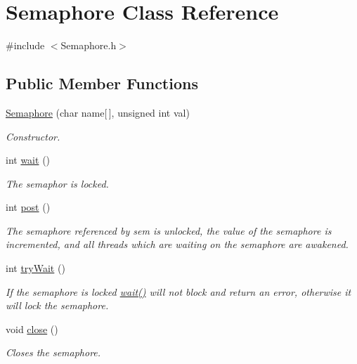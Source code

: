 \hypertarget{class_semaphore}{
\section{\-Semaphore \-Class \-Reference}
\label{class_semaphore}
}


{\ttfamily \#include $<$\-Semaphore.\-h$>$}

\subsection*{\-Public \-Member \-Functions}
\begin{DoxyCompactItemize}
\item 
\hyperlink{class_semaphore_a1f293d68a9b8a8a0aa4a35b6975f8e2a}{\-Semaphore} (char name\mbox{[}$\,$\mbox{]}, unsigned int val)
\begin{DoxyCompactList}\small\item\em \-Constructor. \end{DoxyCompactList}\item 
int \hyperlink{class_semaphore_ab50da3ab3fdc7f56acc85cbdf248c98d}{wait} ()
\begin{DoxyCompactList}\small\item\em \-The semaphor is locked. \end{DoxyCompactList}\item 
int \hyperlink{class_semaphore_a93794b9ab0c6c7c35acce0769bf67caf}{post} ()
\begin{DoxyCompactList}\small\item\em \-The semaphore referenced by sem is unlocked, the value of the semaphore is incremented, and all threads which are waiting on the semaphore are awakened. \end{DoxyCompactList}\item 
int \hyperlink{class_semaphore_acc15178e43d33745f4acc6e2b2cccf9b}{try\-Wait} ()
\begin{DoxyCompactList}\small\item\em \-If the semaphore is locked \hyperlink{class_semaphore_ab50da3ab3fdc7f56acc85cbdf248c98d}{wait()} will not block and return an error, otherwise it will lock the semaphore. \end{DoxyCompactList}\item 
void \hyperlink{class_semaphore_ab04c0934fbf281eb49bd332ecd07c856}{close} ()
\begin{DoxyCompactList}\small\item\em \-Closes the semaphore. \end{DoxyCompactList}\end{DoxyCompactItemize}


